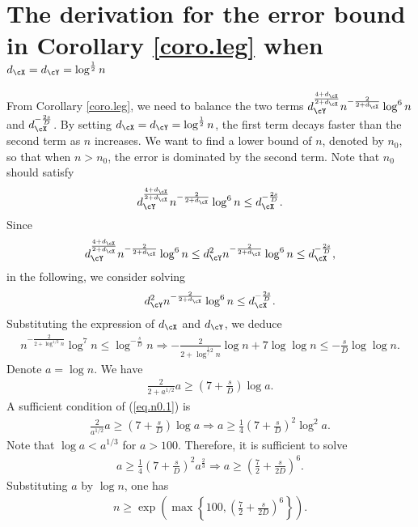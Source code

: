 \documentclass[11pt]{article} %
\begin{document}
\section{The derivation for the error bound in Corollary \ref{coro.leg} when $d_{\cX}=d_{\cY}=\log^{\frac{1}{2}} n$}
\label{sec.n0.proof}
From Corollary \ref{coro.leg}, we need to balance the two terms $d_{\cY}^{\frac{4+d_{\cX}}{2+d_{\cX}}}n^{-\frac{2}{2+d_{\cX}}}\log^6 n$ and $d_{\cX}^{-\frac{2s}{D}}$. By setting $d_{\cX}=d_{\cY}=\log^{\frac{1}{2}}n$, the first term decays faster than the second term as $n$ increases. We want to find a lower bound of $n$, denoted by $n_0$, so that when $n>n_0$, the error is dominated by the second term. Note that $n_0$ should satisfy
\begin{align}
	d_{\cY}^{\frac{4+d_{\cX}}{2+d_{\cX}}}n^{-\frac{2}{2+d_{\cX}}}\log^6 n \leq  d_{\cX}^{-\frac{2s}{D}}.
	\label{eq.n0}
\end{align}
Since
\begin{align*}
	d_{\cY}^{\frac{4+d_{\cX}}{2+d_{\cX}}}n^{-\frac{2}{2+d_{\cX}}}\log^6 n \leq d_{\cY}^{2}n^{-\frac{2}{2+d_{\cX}}}\log^6 n\leq  d_{\cX}^{-\frac{2s}{D}},
\end{align*}
in the following, we consider solving 
\begin{align*}
	d_{\cY}^{2}n^{-\frac{2}{2+d_{\cX}}}\log^6 n\leq  d_{\cX}^{-\frac{2s}{D}}.
\end{align*}
Substituting the expression of $d_{\cX}$ and $d_{\cY}$, we deduce
\begin{align*}
	n^{-\frac{2}{2+\log^{1/2}n}}\log^7 n \leq \log ^{-\frac{s}{D}}n \Rightarrow -\frac{2}{2+\log^{\frac1/2}n}\log n +7\log\log n\leq -\frac{s}{D} \log\log n.
\end{align*}
Denote $a=\log n$. We have
\begin{align}
	\frac{2}{2+a^{1/2}}a \geq \left(7 +\frac{s}{D}\right) \log a.
	\label{eq.n0.1}
\end{align}
A sufficient condition of (\ref{eq.n0.1}) is 
\begin{align}
	\frac{2}{a^{1/2}}a \geq \left(7 +\frac{s}{D}\right) \log a \Rightarrow a\geq \frac{1}{4} \left(7 +\frac{s}{D}\right)^2 \log^2 a.
	\label{eq.n0.2}
\end{align}
Note that $\log a<a^{1/3}$ for $a>100$. Therefore, it is sufficient to solve
\begin{align*}
	a\geq \frac{1}{4} \left(7 +\frac{s}{D}\right)^2 a^{\frac{2}{3}} \Rightarrow a\geq \left(\frac{7}{2}+\frac{s}{2D}\right)^{6}.
\end{align*}
Substituting $a$ by $\log n$, one has
\begin{align*}
	n\geq \exp\left(\max\left\{100,\left(\frac{7}{2}+\frac{s}{2D}\right)^{6}\right\}\right).
\end{align*}
\end{document}
